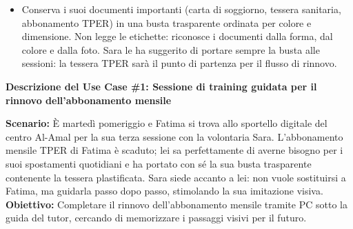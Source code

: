 \documentclass[11pt,a4paper]{article}
\begin{document}
\begin{center}
\begin{tcolorbox}[colback=backgroundColor!50,colframe=borderColor,arc=2mm]
{\begin{itemize}[leftmargin=*]
        \item Conserva i suoi documenti importanti
        (carta di soggiorno, tessera sanitaria,
        abbonamento TPER) in una busta trasparente
        ordinata per colore e dimensione. Non legge
        le etichette: riconosce i documenti dalla
        forma, dal colore e dalla foto.
        Sara le ha suggerito di portare sempre
        la busta alle sessioni: la tessera TPER
        sarà il punto di partenza per il flusso
        di rinnovo.
    \end{itemize}
    }
\end{tcolorbox}

\begin{tcolorbox}[colback=primaryColor!10,colframe=primaryColor,arc=2mm]
    \textbf{Descrizione del Use Case \#1: Sessione di training guidata per il rinnovo dell'abbonamento mensile}
\end{tcolorbox}

\vspace{0.3cm}

\begin{tcolorbox}[colback=backgroundColor,colframe=borderColor,arc=2mm]
    {\small
    \textbf{Scenario:} È martedì pomeriggio e Fatima si trova allo sportello digitale del centro Al-Amal per la sua terza sessione con la volontaria Sara. L'abbonamento mensile TPER di Fatima è scaduto; lei sa perfettamente di averne bisogno per i suoi spostamenti quotidiani e ha portato con sé la sua busta trasparente contenente la tessera plastificata. Sara siede accanto a lei: non vuole sostituirsi a Fatima, ma guidarla passo dopo passo, stimolando la sua imitazione visiva. 
    \textbf{Obiettivo:} Completare il rinnovo dell'abbonamento mensile tramite PC sotto la guida del tutor, cercando di memorizzare i passaggi visivi per il futuro. \\[4pt]

}
\end{tcolorbox}
\end{center}
\end{document}
